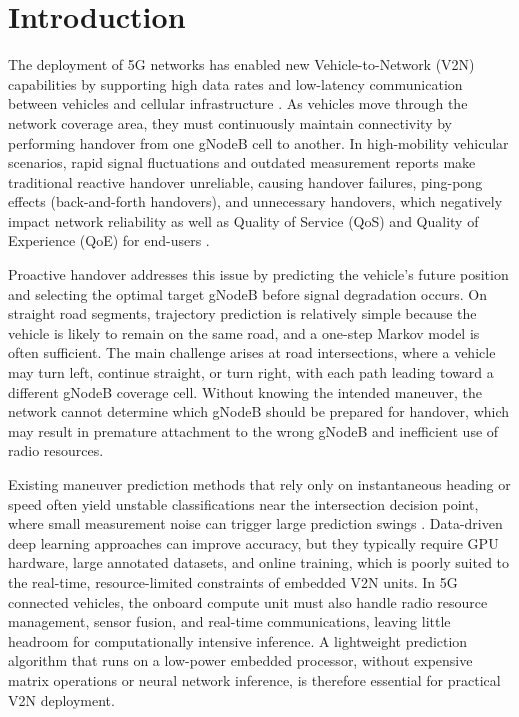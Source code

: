 \documentclass[conference]{IEEEtran}
\begin{document}
\section{Introduction}
\label{sec:intro}

The deployment of 5G networks has enabled new Vehicle-to-Network (V2N) capabilities by supporting high data rates and low-latency communication between vehicles and cellular infrastructure \cite{pawar2024intelligent}.
As vehicles move through the network coverage area, they must continuously maintain connectivity by performing handover from one gNodeB cell to another.
In high-mobility vehicular scenarios, rapid signal fluctuations and outdated measurement reports make traditional reactive handover unreliable, causing handover failures, ping-pong effects (back-and-forth handovers), and unnecessary handovers, which negatively impact network reliability as well as Quality of Service (QoS) and Quality of Experience (QoE) for end-users \cite{sun2021multi}.

Proactive handover addresses this issue by predicting the vehicle’s future position and selecting the optimal target gNodeB before signal degradation occurs. 
On straight road segments, trajectory prediction is relatively simple because the vehicle is likely to remain on the same road, and a one-step Markov model is often sufficient. 
The main challenge arises at road intersections, where a vehicle may turn left, continue straight, or turn right, with each path leading toward a different gNodeB coverage cell. 
Without knowing the intended maneuver, the network cannot determine which gNodeB should be prepared for handover, which may result in premature attachment to the wrong gNodeB and inefficient use of radio resources.

Existing maneuver prediction methods that rely only on instantaneous heading or speed often yield unstable classifications near the intersection decision point, where small measurement noise can trigger large prediction swings \cite{katrakazas2015real}. 
Data-driven deep learning approaches \cite{altche2017lstm, lefkopoulos2021interaction} can improve accuracy, but they typically require GPU hardware, large annotated datasets, and online training, which is poorly suited to the real-time, resource-limited constraints of embedded V2N units. 
In 5G connected vehicles, the onboard compute unit must also handle radio resource management, sensor fusion, and real-time communications, leaving little headroom for computationally intensive inference. 
A lightweight prediction algorithm that runs on a low-power embedded processor, without expensive matrix operations or neural network inference, is therefore essential for practical V2N deployment.
\end{document}
